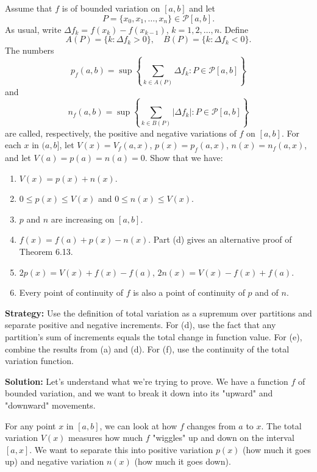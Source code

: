 \begin{problembox}
Assume that $f$ is of bounded variation on $[a, b]$ and let
\[P = \{x_0, x_1, \ldots, x_n\} \in \mathcal{P}[a, b].\]
As usual, write $\Delta f_k = f(x_k) - f(x_{k-1})$, $k = 1, 2, \ldots, n$. Define
\[A(P) = \{k : \Delta f_k > 0\}, \quad B(P) = \{k : \Delta f_k < 0\}.\]
The numbers
\[p_f(a, b) = \sup \left\{ \sum_{k \in A(P)} \Delta f_k : P \in \mathcal{P}[a, b] \right\}\]
and
\[n_f(a, b) = \sup \left\{ \sum_{k \in B(P)} |\Delta f_k| : P \in \mathcal{P}[a, b] \right\}\]
are called, respectively, the positive and negative variations of $f$ on $[a, b]$. For each $x$ in $(a, b]$, let $V(x) = V_f(a, x)$, $p(x) = p_f(a, x)$, $n(x) = n_f(a, x)$, and let $V(a) = p(a) = n(a) = 0$. Show that we have:
\begin{enumerate}[label=\alph*)]
\item $V(x) = p(x) + n(x)$.
\item $0 \leq p(x) \leq V(x)$ and $0 \leq n(x) \leq V(x)$.
\item $p$ and $n$ are increasing on $[a, b]$.
\item $f(x) = f(a) + p(x) - n(x)$. Part (d) gives an alternative proof of Theorem 6.13.
\item $2p(x) = V(x) + f(x) - f(a)$, $2n(x) = V(x) - f(x) + f(a)$.
\item Every point of continuity of $f$ is also a point of continuity of $p$ and of $n$.
\end{enumerate}
\end{problembox}

\noindent\textbf{Strategy:} Use the definition of total variation as a supremum over partitions and separate positive and negative increments. For (d), use the fact that any partition's sum of increments equals the total change in function value. For (e), combine the results from (a) and (d). For (f), use the continuity of the total variation function.

\bigskip\noindent\textbf{Solution:}
Let's understand what we're trying to prove. We have a function $f$ of bounded variation, and we want to break it down into its "upward" and "downward" movements.

For any point $x$ in $[a,b]$, we can look at how $f$ changes from $a$ to $x$. The total variation $V(x)$ measures how much $f$ "wiggles" up and down on the interval $[a,x]$. We want to separate this into positive variation $p(x)$ (how much it goes up) and negative variation $n(x)$ (how much it goes down).

